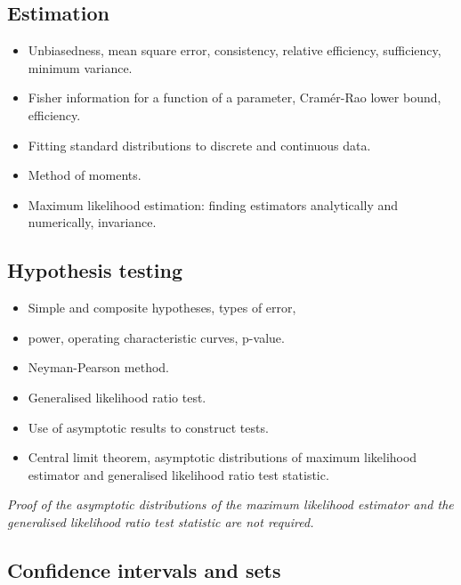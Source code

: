 \subsection*{Estimation}
\begin{itemize}
\item Unbiasedness, mean square error, consistency, 
relative efficiency, sufficiency, minimum variance. 
\item 
Fisher information for a function of a parameter, 
Cramér-Rao lower bound, efficiency. 
\item Fitting 
standard distributions to discrete and continuous 
data. 
\item Method of moments. 
\item Maximum likelihood 
estimation: finding estimators analytically and 
numerically, invariance.
\end{itemize}
\subsection*{Hypothesis testing}

\begin{itemize}
\item	Simple and composite hypotheses, types of error, 
\item	power, operating characteristic curves, p-value. 

\item	Neyman-Pearson method. 
\item	Generalised likelihood ratio test. 

\item	Use of asymptotic results to construct tests. 

\item	Central limit theorem, asymptotic distributions of 
maximum likelihood estimator and generalised 
likelihood ratio test statistic.

\end{itemize}
\textit{Proof of the asymptotic distributions of the maximum likelihood estimator and the 
generalised likelihood ratio test statistic are not required.}
\subsection*{Confidence intervals and sets}


